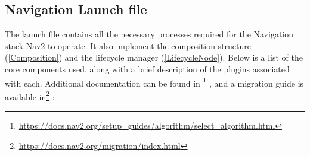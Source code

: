 \subsection{Navigation Launch file}
The launch file contains all the necessary processes required for the  Navigation stack Nav2 to operate. It also implement the composition structure (\ref{Composition}) and the lifecycle manager (\ref{LifecycleNode}).
Below is a list of the core components used, along with a brief description of the plugins associated with each. Additional documentation can be found in  \footnote{\href{https://docs.nav2.org/setup_guides/algorithm/select_algorithm.html}{https://docs.nav2.org/setup\_guides/algorithm/select\_algorithm.html}} , and a migration guide is available in\footnote{\href{https://docs.nav2.org/migration/index.html}{https://docs.nav2.org/migration/index.html}} :
